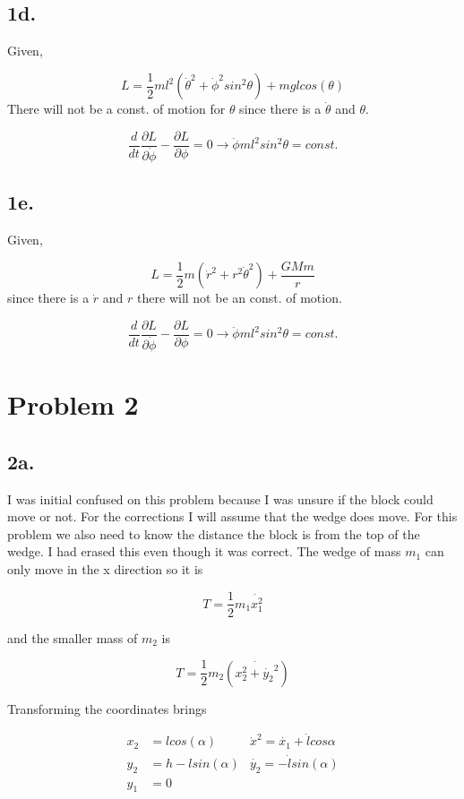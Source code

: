 \documentclass[12pt]{article}
\begin{document}
\subsection*{1d.}
\noindent
Given,

$$
L = \frac{1}{2}ml^{2}(\dot{\theta}^{2} + \dot{\phi}^{2}sin^{2}\theta) + mglcos(\theta)
$$
\noindent
There will not be a const. of motion for $\theta$ since there is a $\dot{\theta}$ and ${\theta}$.

$$
\frac{d}{dt} \frac{\partial L}{\partial \dot{\phi}} - \frac{\partial L}{\partial \phi} = 0 \rightarrow \ddot{\phi}ml^{2}sin^{2}\theta = const.
$$



\subsection*{1e.}
\noindent
Given,

$$
L = \frac{1}{2}m(\dot{r}^{2} + r^{2}\dot{\theta}^{2}) + \frac{GMm}{r}
$$
\noindent
since there is a $\dot{r}$ and $r$ there will not be an const. of motion.

$$
\frac{d}{dt} \frac{\partial L}{\partial \dot{\phi}} - \frac{\partial L}{\partial \phi} = 0 \rightarrow \ddot{\phi}ml^{2}sin^{2}\theta = const.
$$

\section*{Problem 2}


\subsection*{2a.}

I was initial confused on this problem because I was unsure if the block could move or not. For the corrections I will assume that the wedge does move. For this problem we also need to know the distance the block is from the top of the wedge. I had erased this even though it was correct. The wedge of mass $m_{1}$ can only move in the x direction so it is 

$$
T = \frac{1}{2}m_{1} \dot{x_{1}^{2}}
$$

and the smaller mass of $m_{2}$ is 

$$
T = \frac{1}{2}m_{2}(\dot{x_{2}^{2} + \dot{y_{2}}^{2}})
$$

Transforming the coordinates brings 

\begin{align}
x_{2} &= lcos(\alpha)  &\dot{x}^{2} = \dot{x_{1}} + \dot{l}cos{\alpha} \\
y_{2} &= h - lsin(\alpha) & \dot{y_{2}} = -\dot{l}sin(\alpha) \\
y_{1} &= 0 
\end{align}
\end{document}
